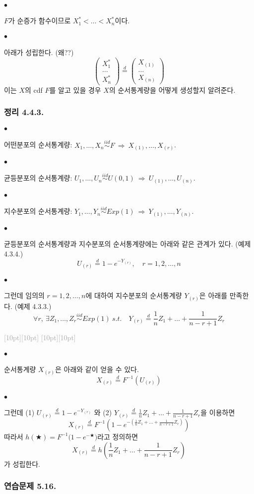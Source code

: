 \documentclass[12pt,oneside,english]{book}
\newcommand{\rdash}{\noindent \textcolor{darkgray}{ \raisebox{-1.9pt}[10pt][10pt]{\leafright} \hrulefill \raisebox{-1.9pt}[10pt][10pt]{\leafright \decofourleft \decothreeleft  \aldineright \decotwo \floweroneleft \decoone}}}
\def\ck{\paragraph{\Large$\bullet$}\Large}
\begin{document}
\ck $F$가 순증가 함수이므로 $X_1^*<\dots<X_n^*$이다. 

\ck 아래가 성립한다. (왜??)
\[
\begin{pmatrix}
X_1^* \\ \dots \\ X_n^*
\end{pmatrix}\overset{d}{=}
\begin{pmatrix}
X_{(1)} \\ \dots \\ X_{(n)}
\end{pmatrix}
\]
이는 $X$의 cdf $F$를 알고 있을 경우 $X$의 순서통계량을 어떻게 생성할지 알려준다. 

\subsubsection{정리 4.4.3.} 

\ck 어떤분포의 순서통계량: $X_1,\dots,X_n \overset{iid}{\sim} F ~ \Longrightarrow ~ X_{(1)},\dots,X_{(r)}$.
\ck 균등분포의 순서통계량: $U_1,\dots,U_n \overset{iid}{\sim} U(0,1) ~ \Longrightarrow ~ U_{(1)},\dots,U_{(n)}$. 

\ck 지수분포의 순서통계량: $Y_1,\dots,Y_n \overset{iid}{\sim} Exp(1) ~ \Longrightarrow ~ Y_{(1)},\dots,Y_{(n)}$. 

\ck 균등분포의 순서통계량과 지수분포의 순서통계량에는 아래와 같은 관계가 있다. (예제 4.3.4.)
\[
U_{(r)}\overset{d}{=}1-e^{-Y_{(r)}}, \quad r=1,2,\dots,n
\]

\ck 그런데 임의의 $r=1,2,\dots,n$에 대하여 지수분포의 순서통계량 $Y_{(r)}$은 아래를 만족한다. (예제 4.3.3.)
\[
\forall r,~  \exists Z_1,\dots,Z_r \overset{iid}{\sim} Exp(1) ~ s.t. \quad Y_{(r)}\overset{d}{=}\frac{1}{n}Z_1+\dots+\frac{1}{n-r+1}Z_r
\]

\rdash 

\ck 순서통계량 $X_{(r)}$은 아래와 같이 얻을 수 있다. 
\[
X_{(r)}\overset{d}{=}F^{-1}(U_{(r)})
\]
\ck 그런데 (1) $U_{(r)}\overset{d}{=}1-e^{-Y_{(r)}}$ 와 (2) $Y_{(r)}\overset{d}{=}\frac{1}{n}Z_1+\dots+\frac{1}{n-r+1}Z_r$을 이용하면 
\[
X_{(r)}\overset{d}{=}F^{-1}\left(1-e^{-(\frac{1}{n}Z_1+\dots+\frac{1}{n-r+1}Z_r)}\right)
\]
따라서 $h(\bigstar)=F^{-1}\big(1-e^{-\bigstar}\big)$라고 정의하면 
\[
X_{(r)}\overset{d}{=}h\left(\frac{1}{n}Z_1+\dots+\frac{1}{n-r+1}Z_r\right)
\]
가 성립한다. 

\subsubsection{연습문제 5.16.}
\end{document}
